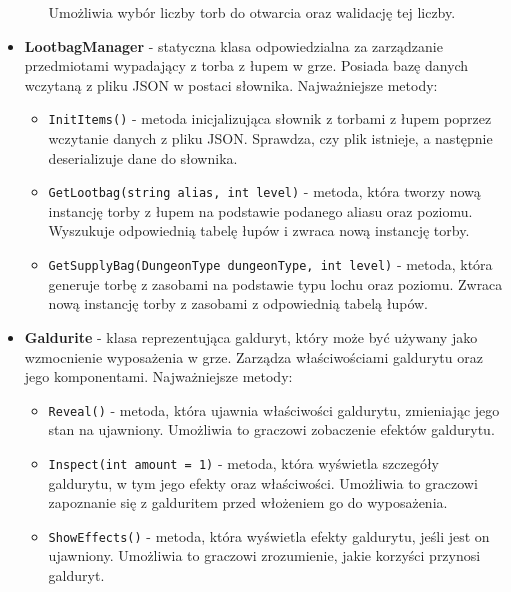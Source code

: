 \begin{itemize}
\begin{itemize}
                    Umożliwia wybór liczby torb do otwarcia oraz walidację tej liczby.
                \end{itemize}
            \item \textbf{LootbagManager} - statyczna klasa odpowiedzialna za zarządzanie przedmiotami wypadający z torba z łupem w grze. 
            Posiada bazę danych wczytaną z pliku JSON w postaci słownika. Najważniejsze metody:
                \begin{itemize}
                    \item \texttt{InitItems()} - metoda inicjalizująca słownik z torbami z łupem poprzez wczytanie danych z pliku JSON. 
                    Sprawdza, czy plik istnieje, a następnie deserializuje dane do słownika.
                    \item \texttt{GetLootbag(string alias, int level)} - metoda, która tworzy nową instancję torby z łupem na podstawie podanego 
                    aliasu oraz poziomu. Wyszukuje odpowiednią tabelę łupów i zwraca nową instancję torby.
                    \item \texttt{GetSupplyBag(DungeonType dungeonType, int level)} - metoda, która generuje torbę z zasobami na podstawie typu lochu 
                    oraz poziomu. Zwraca nową instancję torby z zasobami z odpowiednią tabelą łupów.
                \end{itemize}
            \item \textbf{Galdurite} - klasa reprezentująca galduryt, który może być używany jako wzmocnienie wyposażenia w grze. 
            Zarządza właściwościami galdurytu oraz jego komponentami. Najważniejsze metody:
                \begin{itemize}
                    \item \texttt{Reveal()} - metoda, która ujawnia właściwości galdurytu, zmieniając jego stan na ujawniony. 
                    Umożliwia to graczowi zobaczenie efektów galdurytu.
                    \item \texttt{Inspect(int amount = 1)} - metoda, która wyświetla szczegóły galdurytu, w tym jego efekty oraz właściwości. 
                    Umożliwia to graczowi zapoznanie się z galduritem przed włożeniem go do wyposażenia.
                    \item \texttt{ShowEffects()} - metoda, która wyświetla efekty galdurytu, jeśli jest on ujawniony. 
                    Umożliwia to graczowi zrozumienie, jakie korzyści przynosi galduryt.
                \end{itemize}

\end{itemize}
